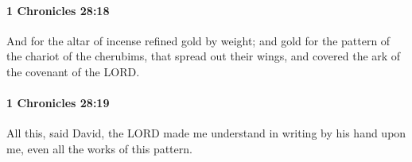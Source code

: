 		\paragraph{1 Chronicles 28:18} %
			\label{1CHRONICLES-28-18}

			And for the altar of incense refined gold by weight; and gold for the pattern of the chariot of the cherubims, that spread out their wings, and covered the ark of the covenant of the LORD.


		\paragraph{1 Chronicles 28:19} %
			\label{1CHRONICLES-28-19}

			All this, said David, the LORD made me understand in writing by his hand upon me, even all the works of this pattern.


